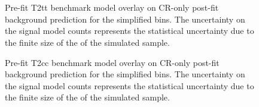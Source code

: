 \begin{figure}[h!]
    \begin{center}
         \\
         \\
        \caption{
            Pre-fit T2tt benchmark model overlay on CR-only post-fit
            background prediction for the simplified bins. The uncertainty on
            the signal model counts represents the statistical uncertainty due
            to the finite size of the of the simulated sample.
        }
        \label{fig:T2tt_MR_simp}
    \end{center}
\end{figure}

\begin{figure}[h!]
    \begin{center}
        \caption{
            Pre-fit T2cc benchmark model overlay on CR-only post-fit
            background prediction for the simplified bins. The uncertainty on
            the signal model counts represents the statistical uncertainty due
            to the finite size of the of the simulated sample.
        }
        \label{fig:T2cc_MR_simp}
    \end{center}
\end{figure}
